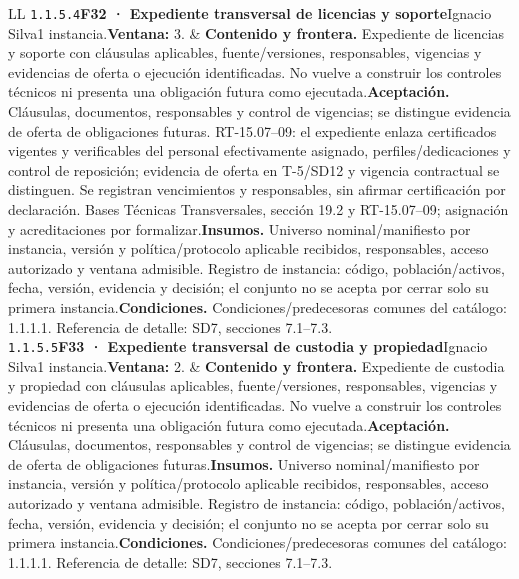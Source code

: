 \begin{longtable}{L{\tabcolsep\relax}L{\tabcolsep\relax}}
\texttt{1.\allowbreak{}1.\allowbreak{}5.\allowbreak{}4}\newline{}\textbf{F32 · Expediente transversal de licencias y soporte}\newline{}Ignacio Silva\newline{}1 instancia.\newline{}\textbf{Ventana:} 3. & \textbf{Contenido y frontera.} Expediente de licencias y soporte con cláusulas aplicables, fuente/versiones, responsables, vigencias y evidencias de oferta o ejecución identificadas. No vuelve a construir los controles técnicos ni presenta una obligación futura como ejecutada.\newline{}\textbf{Aceptación.} Cláusulas, documentos, responsables y control de vigencias; se distingue evidencia de oferta de obligaciones futuras. RT-15.07--09: el expediente enlaza certificados vigentes y verificables del personal efectivamente asignado, perfiles/dedicaciones y control de reposición; evidencia de oferta en T-5/SD12 y vigencia contractual se distinguen. Se registran vencimientos y responsables, sin afirmar certificación por declaración. Bases Técnicas Transversales, sección 19.2 y RT-15.07--09; asignación y acreditaciones por formalizar.\newline{}\textbf{Insumos.} Universo nominal/manifiesto por instancia, versión y política/protocolo aplicable recibidos, responsables, acceso autorizado y ventana admisible. Registro de instancia: código, población/activos, fecha, versión, evidencia y decisión; el conjunto no se acepta por cerrar solo su primera instancia.\newline{}\textbf{Condiciones.} Condiciones/predecesoras comunes del catálogo: 1.1.1.1. Referencia de detalle: SD7, secciones 7.1--7.3.\\\hline
\texttt{1.\allowbreak{}1.\allowbreak{}5.\allowbreak{}5}\newline{}\textbf{F33 · Expediente transversal de custodia y propiedad}\newline{}Ignacio Silva\newline{}1 instancia.\newline{}\textbf{Ventana:} 2. & \textbf{Contenido y frontera.} Expediente de custodia y propiedad con cláusulas aplicables, fuente/versiones, responsables, vigencias y evidencias de oferta o ejecución identificadas. No vuelve a construir los controles técnicos ni presenta una obligación futura como ejecutada.\newline{}\textbf{Aceptación.} Cláusulas, documentos, responsables y control de vigencias; se distingue evidencia de oferta de obligaciones futuras.\newline{}\textbf{Insumos.} Universo nominal/manifiesto por instancia, versión y política/protocolo aplicable recibidos, responsables, acceso autorizado y ventana admisible. Registro de instancia: código, población/activos, fecha, versión, evidencia y decisión; el conjunto no se acepta por cerrar solo su primera instancia.\newline{}\textbf{Condiciones.} Condiciones/predecesoras comunes del catálogo: 1.1.1.1. Referencia de detalle: SD7, secciones 7.1--7.3.\\\hline

\end{longtable}
